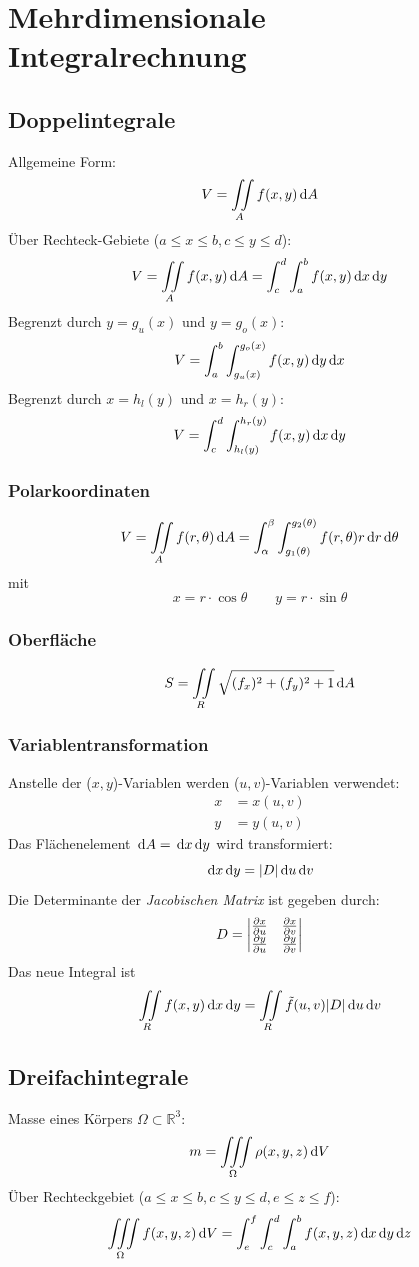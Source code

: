 \chapter{Mehrdimensionale Integralrechnung}
\section{Doppelintegrale}
Allgemeine Form:
\[ V = \iint\limits_A f(x,y)\,\mathrm{d} A \]
Über Rechteck-Gebiete ($a\leq x\leq b, c\leq y\leq d$):
\[ V=\iint\limits_{A}f(x,y)\,\mathrm{d} A = \int_{c}^{d}\int_{a}^{b}f(x,y)\,\mathrm{d} x\,\mathrm{d} y \]
Begrenzt durch $y=g_u(x)$ und $y=g_o(x)$:
\[ V = \int_{a}^{b} \int_{g_u(x)}^{g_o(x)} f(x,y)\,\mathrm{d} y\,\mathrm{d} x \]
Begrenzt durch $x=h_l(y)$ und $x=h_r(y)$:
\[ V = \int_{c}^{d} \int_{h_l(y)}^{h_r(y)} f(x,y)\,\mathrm{d} x\,\mathrm{d} y \]

\subsection{Polarkoordinaten}
\[ V = \iint\limits_A f(r,\theta)\,\mathrm{d} A = \int_{\alpha}^{\beta}\int_{g_1(\theta)}^{g_2(\theta)}
	f(r,\theta)r\,\mathrm{d} r \,\mathrm{d} \theta \]
mit
\[ x = r\cdot\cos\theta \qquad y = r\cdot\sin\theta \]
	
\subsection{Oberfläche}
\[ S = \iint\limits_{R} \sqrt{(f_x)^2+(f_y)^2+1}\,\mathrm{d} A \]

\subsection{Variablentransformation}
Anstelle der ($x,y$)-Variablen werden ($u,v$)-Variablen verwendet:
\[\begin{aligned} x &= x(u,v) \\ y &= y(u,v) \end{aligned}\]
Das Flächenelement $\,\mathrm{d} A = \,\mathrm{d} x\,\mathrm{d} y$ wird transformiert:
\[ \,\mathrm{d} x \,\mathrm{d} y= |D|\,\mathrm{d} u \,\mathrm{d} v \]
Die Determinante der \textit{Jacobischen Matrix} ist gegeben durch:
\[ D = \begin{vmatrix} \frac{\partial x}{\partial u} & \frac{\partial x}{\partial v} \\
	\frac{\partial y}{\partial u} & \frac{\partial y}{\partial v} \end{vmatrix} \]
Das neue Integral ist
\[ \iint\limits_R f(x,y)\,\mathrm{d} x\,\mathrm{d} y = \iint\limits_R \tilde{f}(u,v)|D|\,\mathrm{d} u\,\mathrm{d} v \]


\section{Dreifachintegrale}
Masse eines Körpers $\Omega\subset\mathds{R}^3$:
\[ m = \iiint\limits_{\Omega}\rho(x,y,z)\,\mathrm{d} V \]
Über Rechteckgebiet ($a\leq x\leq b, c\leq y\leq d,e\leq z\leq f$):
\[ \iiint\limits_\Omega f(x,y,z)\,\mathrm{d} V = 
	\int_{e}^{f}\int_{c}^{d}\int_{a}^{b}f(x,y,z)\,\mathrm{d} x\,\mathrm{d} y\,\mathrm{d} z  \]

